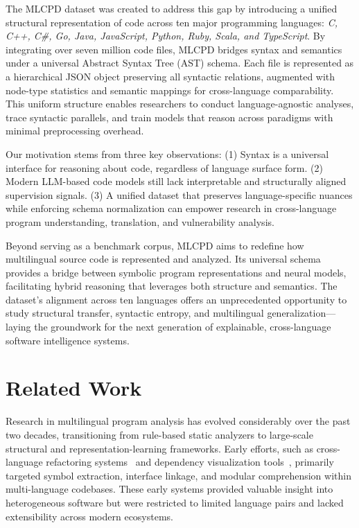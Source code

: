 \documentclass{article}
\begin{document}
The MLCPD dataset was created to address this gap by introducing a unified structural representation of code across ten major programming languages: \emph{C, C++, C\#, Go, Java, JavaScript, Python, Ruby, Scala, and TypeScript}. By integrating over seven million code files, MLCPD bridges syntax and semantics under a universal Abstract Syntax Tree (AST) schema. Each file is represented as a hierarchical JSON object preserving all syntactic relations, augmented with node-type statistics and semantic mappings for cross-language comparability. This uniform structure enables researchers to conduct language-agnostic analyses, trace syntactic parallels, and train models that reason across paradigms with minimal preprocessing overhead.

Our motivation stems from three key observations:  
(1) Syntax is a universal interface for reasoning about code, regardless of language surface form.  
(2) Modern LLM-based code models still lack interpretable and structurally aligned supervision signals.  
(3) A unified dataset that preserves language-specific nuances while enforcing schema normalization can empower research in cross-language program understanding, translation, and vulnerability analysis.

Beyond serving as a benchmark corpus, MLCPD aims to redefine how multilingual source code is represented and analyzed. Its universal schema provides a bridge between symbolic program representations and neural models, facilitating hybrid reasoning that leverages both structure and semantics. The dataset’s alignment across ten languages offers an unprecedented opportunity to study structural transfer, syntactic entropy, and multilingual generalization—laying the groundwork for the next generation of explainable, cross-language software intelligence systems.

\section{Related Work}

Research in multilingual program analysis has evolved considerably over the past two decades, transitioning from rule-based static analyzers to large-scale structural and representation-learning frameworks. Early efforts, such as cross-language refactoring systems~\cite{mayer2012cross} and dependency visualization tools~\cite{linos2003tool}, primarily targeted symbol extraction, interface linkage, and modular comprehension within multi-language codebases. These early systems provided valuable insight into heterogeneous software but were restricted to limited language pairs and lacked extensibility across modern ecosystems.
\end{document}
